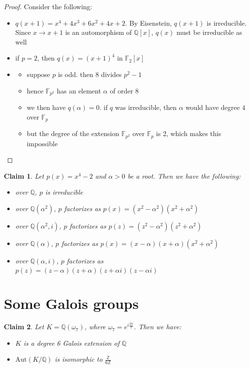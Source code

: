 \documentclass{article}
\newtheorem{claim}{Claim}
\begin{document}
\begin{proof}
  Consider the following:
  \begin{itemize}
    \item $q(x+1)=x^4+4x^3+6x^2+4x+2$. By Eisenstein, $q(x+1)$ is irreducible. Since $x \to x+1$ is an automorphism of $\mathbb{Q}[x]$, $q(x)$ must be irreducible as well
    \item if $p=2$, then $q(x)=(x+1)^4$ in $\mathbb{F}_2[x]$
    \item 
      \begin{itemize}
        \item suppose $p$ is odd. then $8$ divides $p^2-1$
        \item hence $\mathbb{F}_{p^2}$ has an element $\alpha$ of order $8$
        \item we then have $q(\alpha)=0$. if $q$ was irreducible, then $\alpha$ would have degree $4$ over $\mathbb{F}_p$
        \item but the degree of the extension $\mathbb{F}_{p^2}$ over $\mathbb{F}_p$ is 2, which makes this impossible
      \end{itemize}
  \end{itemize}
\end{proof}

\begin{claim}
  Let $p(x)=x^4-2$ and $\alpha>0$ be a root. Then we have the following:
  \begin{itemize}
    \item over $\mathbb{Q}$, $p$ is irreducible
    \item over $\mathbb{Q}(\alpha^2)$, $p$ factorizes as $p(x)=(x^2-\alpha^2)(x^2+\alpha^2)$
    \item over $\mathbb{Q}(\alpha^2,i)$, $p$ factorizes as $p(z)=(z^2-\alpha^2)(z^2+\alpha^2)$
    \item over $\mathbb{Q}(\alpha)$, $p$ factorizes as $p(x)=(x-\alpha)(x+\alpha)(x^2+\alpha^2)$
    \item over $\mathbb{Q}(\alpha,i)$, $p$ factorizes as $p(z)=(z-\alpha)(z+\alpha)(z+\alpha i)(z-\alpha i)$
  \end{itemize}
\end{claim}

\section{Some Galois groups}

\begin{claim}
  Let $K=\mathbb{Q}(\omega_7)$, where $\omega_7 = e^{i\frac{2\pi}{7}}$. 
  Then we have:
  \begin{itemize}
    \item $K$ is a degree 6 Galois extension of $\mathbb{Q}$
    \item $\text{Aut}(K/\mathbb{Q})$ is isomorphic to $\frac{\mathbb{Z}}{6\mathbb{Z}}$
  \end{itemize}
\end{claim}
\end{document}
